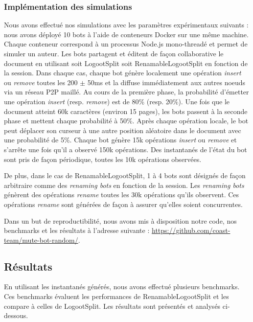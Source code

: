 \documentclass[12pt]{thesul}
\begin{document}
\subsubsection{Implémentation des simulations}

Nous avons effectué nos simulations avec les paramètres expérimentaux suivants : nous avons déployé 10 bots à l'aide de conteneurs Docker sur une même machine.
Chaque conteneur correspond à un processus Node.js mono-threadé et permet de simuler un auteur.
Les bots partagent et éditent de façon collaborative le document en utilisant soit LogootSplit soit RenamableLogootSplit en fonction de la session.
Dans chaque cas, chaque bot génère localement une opération \emph{insert} ou \emph{remove} toutes les 200 $\pm$ 50ms et la diffuse immédiatement aux autres noeuds via un réseau P2P maillé.
Au cours de la première phase, la probabilité d'émetter une opération \emph{insert} (resp. \emph{remove}) est de 80\% (resp. 20\%).
Une fois que le document atteint 60k caractères (environ 15 pages), les bots passent à la seconde phase et mettent chaque probabilité à 50\%.
Après chaque opération locale, le bot peut déplacer son curseur à une autre position aléatoire dans le document avec une probabilité de 5\%.
Chaque bot génère 15k opérations \emph{insert} ou \emph{remove} et s'arrête une fois qu'il a observé 150k opérations.
Des instantanés de l'état du bot sont pris de façon périodique, toutes les 10k opérations observées.

De plus, dans le cas de RenamableLogootSplit, 1 à 4 bots sont désignés de façon arbitraire comme des \emph{renaming bots} en fonction de la session.
Les \emph{renaming bots} génèrent des opérations \emph{rename} toutes les 30k opérations qu'ils observent.
Ces opérations \emph{rename} sont générées de façon à assurer qu'elles soient concurrentes.

Dans un but de reproductibilité, nous avons mis à disposition notre code, nos benchmarks et les résultats à l'adresse suivante : \url{https://github.com/coast-team/mute-bot-random/}.

\subsection{Résultats}

En utilisant les instantanés générés, nous avons effectué plusieurs benchmarks.
Ces benchmarks évaluent les performances de RenamableLogootSplit et les compare à celles de LogootSplit.
Les résultats sont présentés et analysés ci-dessous.
\end{document}
